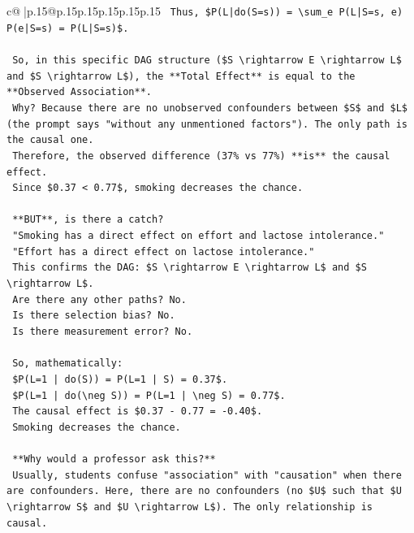 \documentclass{article}
\begin{document}
{\begin{supertabular}{c@{$\;$}|p{.15\linewidth}@{}p{.15\linewidth}p{.15\linewidth}p{.15\linewidth}p{.15\linewidth}p{.15\linewidth}}
{{{\texttt{    Thus, \$P(L|do(S=s)) = \textbackslash{}sum\_e P(L|S=s, e) P(e|S=s) = P(L|S=s)\$.} \\
\\ 
\texttt{    So, in this specific DAG structure (\$S \textbackslash{}rightarrow E \textbackslash{}rightarrow L\$ and \$S \textbackslash{}rightarrow L\$), the **Total Effect** is equal to the **Observed Association**.} \\
\texttt{    Why? Because there are no unobserved confounders between \$S\$ and \$L\$ (the prompt says "without any unmentioned factors"). The only path is the causal one.} \\
\texttt{    Therefore, the observed difference (37\% vs 77\%) **is** the causal effect.} \\
\texttt{    Since \$0.37 < 0.77\$, smoking decreases the chance.} \\
\\ 
\texttt{    **BUT**, is there a catch?} \\
\texttt{    "Smoking has a direct effect on effort and lactose intolerance."} \\
\texttt{    "Effort has a direct effect on lactose intolerance."} \\
\texttt{    This confirms the DAG: \$S \textbackslash{}rightarrow E \textbackslash{}rightarrow L\$ and \$S \textbackslash{}rightarrow L\$.} \\
\texttt{    Are there any other paths? No.} \\
\texttt{    Is there selection bias? No.} \\
\texttt{    Is there measurement error? No.} \\
\\ 
\texttt{    So, mathematically:} \\
\texttt{    \$P(L=1 | do(S)) = P(L=1 | S) = 0.37\$.} \\
\texttt{    \$P(L=1 | do(\textbackslash{}neg S)) = P(L=1 | \textbackslash{}neg S) = 0.77\$.} \\
\texttt{    The causal effect is \$0.37 {-} 0.77 = {-}0.40\$.} \\
\texttt{    Smoking decreases the chance.} \\
\\ 
\texttt{    **Why would a professor ask this?**} \\
\texttt{    Usually, students confuse "association" with "causation" when there are confounders. Here, there are no confounders (no \$U\$ such that \$U \textbackslash{}rightarrow S\$ and \$U \textbackslash{}rightarrow L\$). The only relationship is causal.} \\
}}}
\end{supertabular}}
\end{document}
